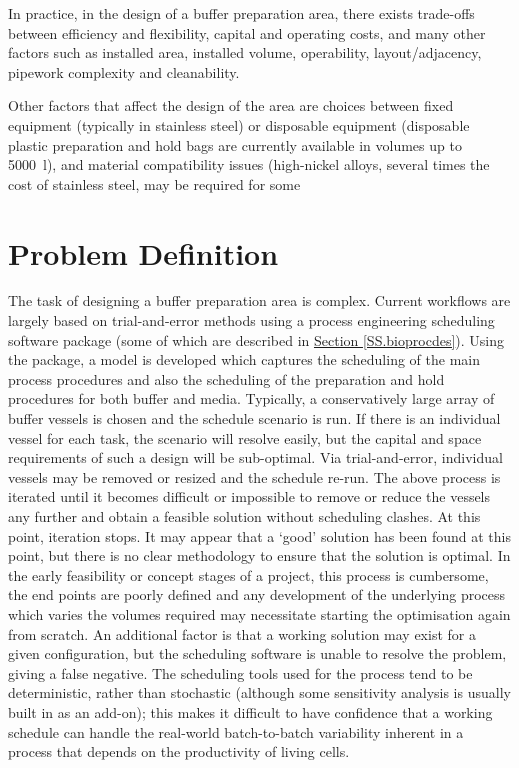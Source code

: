 In practice, in the design of a buffer preparation area, there exists
trade-offs between efficiency and flexibility, capital and operating costs,
and many other factors such as installed area, installed volume, operability,
layout/adjacency, pipework complexity and cleanability.

Other factors that affect the design of the area are choices between fixed
equipment (typically in stainless steel) or disposable equipment (disposable
plastic preparation and hold bags are currently available in volumes up to
\SI{5000}{\litre}), and material compatibility issues (high-nickel alloys,
several times the cost of stainless steel, may be required for some

\section{Problem Definition}\label{SS.probdef}
The task of designing a buffer preparation area is complex.
Current workflows are largely based on trial-and-error methods using a process
engineering scheduling software package (some of which are described in
\hyperref[SS.bioprocdes]{Section \ref*{SS.bioprocdes}}).
Using the package, a model is developed which captures the scheduling of the
main process procedures and also the scheduling of the preparation and hold
procedures for both buffer and media.
Typically, a conservatively large array of buffer vessels is chosen and the
schedule scenario is run.
If there is an individual vessel for each task, the scenario will resolve
easily, but the capital and space requirements of such a design will be
sub-optimal.
Via trial-and-error, individual vessels may be removed or resized and
the schedule re-run.
The above process is iterated until it becomes difficult or impossible to
remove or reduce the vessels any further and obtain a feasible solution without
scheduling clashes.
At this point, iteration stops.
It may appear that a `good' solution has been found at this point, but there
is no clear methodology to ensure that the solution is optimal.
In the early feasibility or concept stages of a project, this process is
cumbersome, the end points are poorly defined and any development of the
underlying process which varies the volumes required may necessitate starting
the optimisation again from scratch.
An additional factor is that a working solution may exist for a given
configuration, but the scheduling software is unable to resolve the problem,
giving a false negative. 
The scheduling tools used for the process tend to be deterministic, rather than
stochastic (although some sensitivity analysis is usually built in as an 
add-on); this makes it difficult to have confidence that a working schedule can
handle the real-world batch-to-batch variability inherent in a process that
depends on the productivity of living cells.

